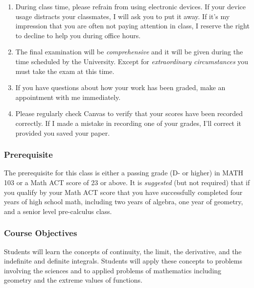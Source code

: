 \documentclass[12pt]{article}
\newcounter{ex}\setcounter{ex}{0}
\begin{document}
\begin{enumerate}
 

\item During class time, please refrain from using electronic devices. If your 
device usage distracts your classmates, I will ask you to put it away. If it's my 
impression that you are often not paying attention in class, I reserve the right to 
decline to help you during office hours.

\item The final examination will be \emph{comprehensive} and it will be given 
during the  time scheduled by the University. Except for \emph{extraordinary circumstances}
you must take the exam at this time.
 
\item If you have questions about how your work has been graded, make an appointment with me immediately.



\item Please regularly check Canvas  to verify that your scores have 
been recorded correctly.  If I made a mistake in recording one of
your grades, I'll correct it provided you saved your paper.



\end{enumerate}







\subsubsection*{Prerequisite}

The prerequisite for this class is either a passing grade (D- or higher) in MATH 103 or a Math ACT score of 23 or above.  It is \emph{suggested} (but not required)  that if you qualify by your Math ACT score that you have successfully completed  four years of high school math, including two  years of  algebra, one year of geometry,  and a senior  level pre-calculus class.



\subsubsection*{Course Objectives}

Students will learn the concepts of continuity,  the limit, the derivative, and the indefinite and definite integrals. Students will apply these concepts to problems involving the sciences and to applied problems of mathematics including geometry and the extreme values of functions.
\end{document}
